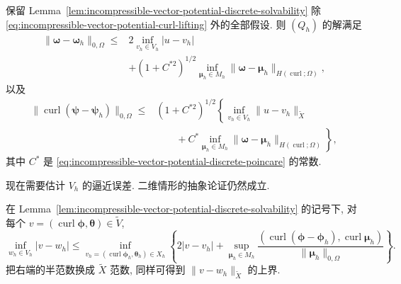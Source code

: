 \begin{Theorem}\label{thm:incompressible-vector-potential-abstract-error}
保留 Lemma~\ref{lem:incompressible-vector-potential-discrete-solvability}
除 \eqref{eq:incompressible-vector-potential-curl-lifting} 外的全部假设.
则 $(Q_h)$ 的解满足
\begin{equation}\label{eq:incompressible-vector-potential-vorticity-abstract-error}
\begin{split}
\|\boldsymbol\omega-\boldsymbol\omega_h\|_{0,\Omega}
\leq{}&2\inf_{v_h\in V_h}|u-v_h|\\
&+(1+C^{*2})^{1/2}
\inf_{\boldsymbol\mu_h\in M_h}
\|\boldsymbol\omega-\boldsymbol\mu_h\|_{H(\operatorname{curl};\Omega)},
\end{split}
\end{equation}
以及
\begin{equation}\label{eq:incompressible-vector-potential-velocity-abstract-error}
\begin{split}
\|\operatorname{curl}(\boldsymbol\psi-\boldsymbol\psi_h)\|_{0,\Omega}
\leq{}&(1+C^{*2})^{1/2}
\left\{\inf_{v_h\in V_h}\|u-v_h\|_{\widetilde X}\right.\\
&\left.\qquad+C^*\inf_{\boldsymbol\mu_h\in M_h}
\|\boldsymbol\omega-\boldsymbol\mu_h\|_{H(\operatorname{curl};\Omega)}\right\},
\end{split}
\end{equation}
其中 $C^*$ 是
\eqref{eq:incompressible-vector-potential-discrete-poincare} 的常数.
\end{Theorem}

现在需要估计 $V_h$ 的逼近误差. 二维情形的抽象论证仍然成立.
\begin{Lemma}\label{lem:incompressible-vector-potential-kernel-approximation}
在 Lemma~\ref{lem:incompressible-vector-potential-discrete-solvability}
的记号下, 对每个
$v=(\operatorname{curl}\boldsymbol\phi,\boldsymbol\theta)\in\widetilde V$,
\begin{equation}\label{eq:incompressible-vector-potential-kernel-approximation}
\inf_{w_h\in V_h}|v-w_h|
\leq\inf_{v_h=(\operatorname{curl}\boldsymbol\phi_h,
\boldsymbol\theta_h)\in X_h}
\left\{2|v-v_h|+
\sup_{\boldsymbol\mu_h\in M_h}
\frac{(\operatorname{curl}(\boldsymbol\phi-\boldsymbol\phi_h),
\operatorname{curl}\boldsymbol\mu_h)}
{\|\boldsymbol\mu_h\|_{0,\Omega}}\right\}.
\end{equation}
把右端的半范数换成 $\widetilde X$ 范数,
同样可得到 $\|v-w_h\|_{\widetilde X}$ 的上界.
\end{Lemma}
